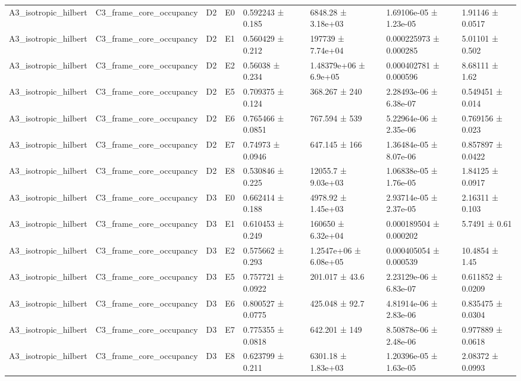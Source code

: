 \begin{table}
\begin{tabular}{lllllllll}
A3\_isotropic\_hilbert & C3\_frame\_core\_occupancy & D2 & E0 & 0.592243 ± 0.185 &  & 6848.28 ± 3.18e+03 & 1.69106e-05 ± 1.23e-05 & 1.91146 ± 0.0517 \\
A3\_isotropic\_hilbert & C3\_frame\_core\_occupancy & D2 & E1 & 0.560429 ± 0.212 &  & 197739 ± 7.74e+04 & 0.000225973 ± 0.000285 & 5.01101 ± 0.502 \\
A3\_isotropic\_hilbert & C3\_frame\_core\_occupancy & D2 & E2 & 0.56038 ± 0.234 &  & 1.48379e+06 ± 6.9e+05 & 0.000402781 ± 0.000596 & 8.68111 ± 1.62 \\
A3\_isotropic\_hilbert & C3\_frame\_core\_occupancy & D2 & E5 & 0.709375 ± 0.124 &  & 368.267 ± 240 & 2.28493e-06 ± 6.38e-07 & 0.549451 ± 0.014 \\
A3\_isotropic\_hilbert & C3\_frame\_core\_occupancy & D2 & E6 & 0.765466 ± 0.0851 &  & 767.594 ± 539 & 5.22964e-06 ± 2.35e-06 & 0.769156 ± 0.023 \\
A3\_isotropic\_hilbert & C3\_frame\_core\_occupancy & D2 & E7 & 0.74973 ± 0.0946 &  & 647.145 ± 166 & 1.36484e-05 ± 8.07e-06 & 0.857897 ± 0.0422 \\
A3\_isotropic\_hilbert & C3\_frame\_core\_occupancy & D2 & E8 & 0.530846 ± 0.225 &  & 12055.7 ± 9.03e+03 & 1.06838e-05 ± 1.76e-05 & 1.84125 ± 0.0917 \\
A3\_isotropic\_hilbert & C3\_frame\_core\_occupancy & D3 & E0 & 0.662414 ± 0.188 &  & 4978.92 ± 1.45e+03 & 2.93714e-05 ± 2.37e-05 & 2.16311 ± 0.103 \\
A3\_isotropic\_hilbert & C3\_frame\_core\_occupancy & D3 & E1 & 0.610453 ± 0.249 &  & 160650 ± 6.32e+04 & 0.000189504 ± 0.000202 & 5.7491 ± 0.61 \\
A3\_isotropic\_hilbert & C3\_frame\_core\_occupancy & D3 & E2 & 0.575662 ± 0.293 &  & 1.2547e+06 ± 6.08e+05 & 0.000405054 ± 0.000539 & 10.4854 ± 1.45 \\
A3\_isotropic\_hilbert & C3\_frame\_core\_occupancy & D3 & E5 & 0.757721 ± 0.0922 &  & 201.017 ± 43.6 & 2.23129e-06 ± 6.83e-07 & 0.611852 ± 0.0209 \\
A3\_isotropic\_hilbert & C3\_frame\_core\_occupancy & D3 & E6 & 0.800527 ± 0.0775 &  & 425.048 ± 92.7 & 4.81914e-06 ± 2.83e-06 & 0.835475 ± 0.0304 \\
A3\_isotropic\_hilbert & C3\_frame\_core\_occupancy & D3 & E7 & 0.775355 ± 0.0818 &  & 642.201 ± 149 & 8.50878e-06 ± 2.48e-06 & 0.977889 ± 0.0618 \\
A3\_isotropic\_hilbert & C3\_frame\_core\_occupancy & D3 & E8 & 0.623799 ± 0.211 &  & 6301.18 ± 1.83e+03 & 1.20396e-05 ± 1.63e-05 & 2.08372 ± 0.0993 \\

\end{tabular}
\end{table}
